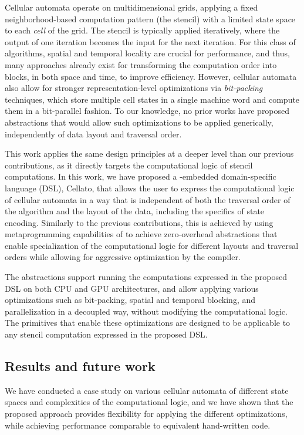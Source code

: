 Cellular automata operate on multidimensional grids, applying a fixed neighborhood-based computation pattern (the stencil) with a limited state space to each \emph{cell} of the grid. The stencil is typically applied iteratively, where the output of one iteration becomes the input for the next iteration. For this class of algorithms, spatial and temporal locality are crucial for performance, and thus, many approaches already exist for transforming the computation order into blocks, in both space and time, to improve efficiency. However, cellular automata also allow for stronger representation-level optimizations via \emph{bit-packing} techniques, which store multiple cell states in a single machine word and compute them in a bit-parallel fashion. To our knowledge, no prior works have proposed abstractions that would allow such optimizations to be applied generically, independently of data layout and traversal order.

This work applies the same design principles at a deeper level than our previous contributions, as it directly targets the computational logic of stencil computations. In this work, we have proposed a \cpp-embedded domain-specific language (DSL), Cellato, that allows the user to express the computational logic of cellular automata in a way that is independent of both the traversal order of the algorithm and the layout of the data, including the specifics of state encoding. Similarly to the previous contributions, this is achieved by using metaprogramming capabilities of \cpp to achieve zero-overhead abstractions that enable
specialization of the computational logic for different layouts and traversal orders while allowing for aggressive optimization by the compiler.

The abstractions support running the computations expressed in the proposed DSL on both CPU and GPU architectures, and allow applying various optimizations such as bit-packing, spatial and temporal blocking, and parallelization in a decoupled way, without modifying the computational logic. The primitives that enable these optimizations are designed to be applicable to any stencil computation expressed in the proposed DSL\@.


\subsection{Results and future work}\label{sec:stencil-computations-results}

We have conducted a case study on various cellular automata of different state spaces and complexities of the computational logic, and we have shown that the proposed approach provides flexibility for applying the different optimizations, while achieving performance comparable to equivalent hand-written code.

